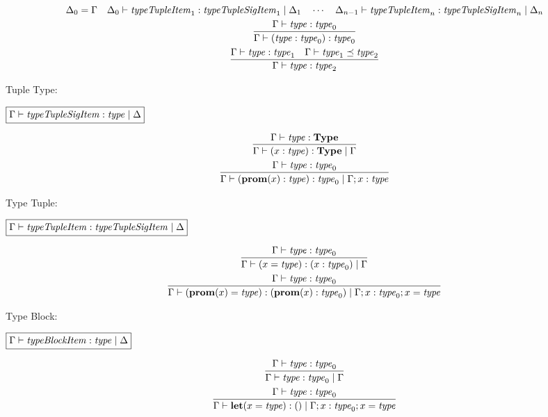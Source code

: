 \begin{gather*}
{\begin{array}{c}
      \\
      \Delta_0 = \Gamma
      \hspace{1em}
      \Delta_0 \vdash \mathit{typeTupleItem}_1: \mathit{typeTupleSigItem}_1 \mid \Delta_1
      \hspace{1em}
      \cdots
      \hspace{1em}
      \Delta_{n - 1} \vdash \mathit{typeTupleItem}_n: \mathit{typeTupleSigItem}_n \mid \Delta_n
    \end{array}
  }
  \\
  \infer{\Gamma \vdash (\mathit{type}: \mathit{type}_0): \mathit{type}_0}{
    \Gamma \vdash \mathit{type}: \mathit{type}_0
  }
  \\
  \infer{\Gamma \vdash \mathit{type}: \mathit{type}_2}{
    \Gamma \vdash \mathit{type}: \mathit{type}_1
    &
    \Gamma \vdash \mathit{type}_1 \preceq \mathit{type}_2
  }
\end{gather*}

Tuple Type:

$\fbox{$\Gamma \vdash \mathit{typeTupleSigItem}: \mathit{type} \mid \Delta$}$

\begin{gather*}
  \infer{\Gamma \vdash (x: \mathit{type}): \mathbf{Type} \mid \Gamma}{
    \Gamma \vdash \mathit{type}: \mathbf{Type}
  }
  \\
  \infer{\Gamma \vdash (\mathbf{prom}(x): \mathit{type}): \mathit{type}_0 \mid \Gamma; x: \mathit{type}}{
    \Gamma \vdash \mathit{type}: \mathit{type}_0
  }
\end{gather*}

Type Tuple:

$\fbox{$\Gamma \vdash \mathit{typeTupleItem}: \mathit{typeTupleSigItem} \mid \Delta$}$

\begin{gather*}
  \infer{\Gamma \vdash (x = \mathit{type}): (x: \mathit{type}_0) \mid \Gamma}{
    \Gamma \vdash \mathit{type}: \mathit{type}_0
  }
  \\
  \infer{\Gamma \vdash (\mathbf{prom}(x) = \mathit{type}): (\mathbf{prom}(x): \mathit{type}_0) \mid \Gamma; x: \mathit{type}_0; x = \mathit{type}}{
    \Gamma \vdash \mathit{type}: \mathit{type}_0
  }
\end{gather*}

Type Block:

$\fbox{$\Gamma \vdash \mathit{typeBlockItem}: \mathit{type} \mid \Delta$}$

\begin{gather*}
  \infer{\Gamma \vdash \mathit{type}: \mathit{type}_0 \mid \Gamma}{
    \Gamma \vdash \mathit{type}: \mathit{type}_0
  }
  \\
  \infer{\Gamma \vdash \mathbf{let}(x = \mathit{type}): () \mid \Gamma; x: \mathit{type}_0; x = \mathit{type}}{
    \Gamma \vdash \mathit{type}: \mathit{type}_0
  }
\end{gather*}

